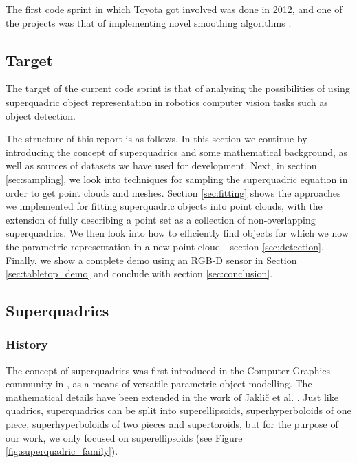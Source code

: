 \documentclass{article}
\begin{document}
The first code sprint in which Toyota got involved was done in 2012, and one of the projects was that of implementing novel smoothing algorithms \cite{tocs_final_report}.

\subsection {Target}
The target of the current code sprint is that of analysing the possibilities of using superquadric object representation in robotics computer vision tasks such as object detection. 

The structure of this report is as follows. In this section we continue by introducing the concept of superquadrics and some mathematical background, as well as sources of datasets we have used for development. Next, in section \ref{sec:sampling}, we look into techniques for sampling the superquadric equation in order to get point clouds and meshes. Section \ref{sec:fitting} shows the approaches we implemented for fitting superquadric objects into point clouds, with the extension of fully describing a point set as a collection of non-overlapping superquadrics. We then look into how to efficiently find objects for which we now the parametric representation in a new point cloud - section \ref{sec:detection}. Finally, we show a complete demo using an RGB-D sensor in Section \ref{sec:tabletop_demo} and conclude with section \ref{sec:conclusion}.


\subsection {Superquadrics}

\subsubsection*{History}
The concept of superquadrics was first introduced in the Computer Graphics community in \cite{1673799}, as a means of versatile parametric object modelling. The mathematical details have been extended in the work of Jakli\v{c} et al. \cite{SQ_2000}. Just like quadrics, superquadrics can be split into superellipsoids, superhyperboloids of one piece, superhyperboloids of two pieces and supertoroids, but for the purpose of our work, we only focused on superellipsoids (see Figure \ref{fig:superquadric_family}).
\end{document}
